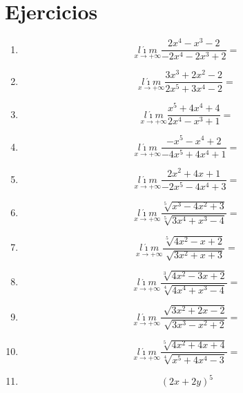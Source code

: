 \documentclass[oneside,spanish,letter]{article}
\begin{document}
\section{Ejercicios}
\begin{enumerate}
 \item $$\underset{x\rightarrow +\infty}{l\acute{\imath}m} \frac{2x^4-x^3-2}{-2x^4-2x^3+2}=$$
 \item $$\underset{x\rightarrow +\infty}{l\acute{\imath}m} \frac{3x^3+2x^2-2}{2x^5+3x^4-2}=$$
 \item $$\underset{x\rightarrow +\infty}{l\acute{\imath}m} \frac{x^5+4x^4+4}{2x^4-x^3+1}=$$
 \item $$\underset{x\rightarrow +\infty}{l\acute{\imath}m} \frac{-x^5-x^4+2}{-4x^5+4x^4+1}=$$
 \item $$\underset{x\rightarrow +\infty}{l\acute{\imath}m} \frac{2x^2+4x+1}{-2x^5-4x^4+3}=$$
 \item $$\underset{x\rightarrow +\infty}{l\acute{\imath}m} \frac{\sqrt[5]{x^3-4x^2+3}}{\sqrt[5]{3x^4+x^3-4}}=$$
 \item $$\underset{x\rightarrow +\infty}{l\acute{\imath}m} \frac{\sqrt[5]{4x^2-x+2}}{\sqrt[]{3x^2+x+3}}=$$
 \item $$\underset{x\rightarrow +\infty}{l\acute{\imath}m} \frac{\sqrt[3]{4x^2-3x+2}}{\sqrt[4]{4x^4+x^3-4}}=$$
 \item $$\underset{x\rightarrow +\infty}{l\acute{\imath}m} \frac{\sqrt[]{3x^2+2x-2}}{\sqrt[]{3x^3-x^2+2}}=$$
 \item $$\underset{x\rightarrow +\infty}{l\acute{\imath}m} \frac{\sqrt[5]{4x^2+4x+4}}{\sqrt[4]{x^5+4x^4-3}}=$$
\item $$(2x+2y)^5$$
 \end{enumerate}
  \newpage
\end{document}
